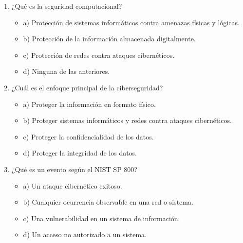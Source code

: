 \documentclass[a4paper]{article}
\begin{document}
\begin{enumerate}
    \item ¿Qué es la seguridad computacional?
    \begin{itemize}
        \item a) Protección de sistemas informáticos contra amenazas físicas y lógicas.
        \item b) Protección de la información almacenada digitalmente.
        \item c) Protección de redes contra ataques cibernéticos.
        \item d) Ninguna de las anteriores.
    \end{itemize}
    
    \item ¿Cuál es el enfoque principal de la ciberseguridad?
    \begin{itemize}
        \item a) Proteger la información en formato físico.
        \item b) Proteger sistemas informáticos y redes contra ataques cibernéticos.
        \item c) Proteger la confidencialidad de los datos.
        \item d) Proteger la integridad de los datos.
    \end{itemize}
    
    \item ¿Qué es un evento según el NIST SP 800?
    \begin{itemize}
        \item a) Un ataque cibernético exitoso.
        \item b) Cualquier ocurrencia observable en una red o sistema.
        \item c) Una vulnerabilidad en un sistema de información.
        \item d) Un acceso no autorizado a un sistema.
    \end{itemize}
    

\end{enumerate}
\end{document}
